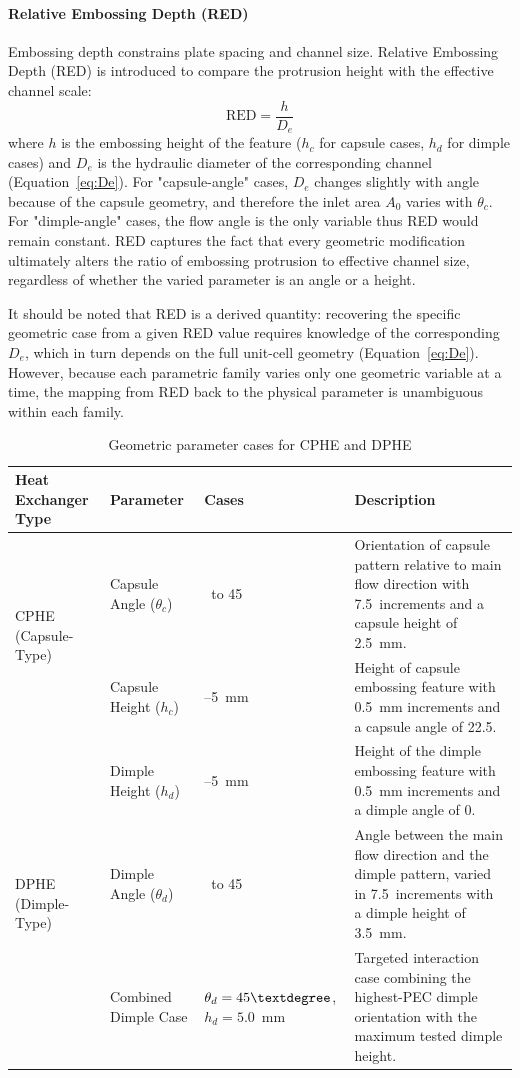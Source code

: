 \documentclass[energies,article,submit,moreauthors,noheaderline]{Definitions/mdpi}
\newcommand{\degree}{\texorpdfstring{\ensuremath{^\circ}}{\textdegree}}
\def\ensuremath#1{}%
\def\degree{\textdegree}%
\begin{document}
\paragraph{Relative Embossing Depth (RED)}
Embossing depth constrains plate spacing and channel size. Relative Embossing Depth (RED) is introduced to compare the protrusion height with the effective channel scale:
\begin{equation}
\text{RED} = \frac{h}{D_e}
\label{eq:red}
\end{equation}
where $h$ is the embossing height of the feature ($h_c$ for capsule cases, $h_d$ for dimple cases) and $D_e$ is the hydraulic diameter of the corresponding channel (Equation~\eqref{eq:De}). For "capsule-angle" cases, $D_e$ changes slightly with angle because of the capsule geometry, and therefore the inlet area $A_0$ varies with $\theta_c$. For "dimple-angle" cases, the flow angle is the only variable thus RED would remain constant. RED captures the fact that every geometric modification ultimately alters the ratio of embossing protrusion to effective channel size, regardless of whether the varied parameter is an angle or a height.

It should be noted that RED is a derived quantity: recovering the specific geometric case from a given RED value requires knowledge of the corresponding $D_e$, which in turn depends on the full unit-cell geometry (Equation~\eqref{eq:De}). However, because each parametric family varies only one geometric variable at a time, the mapping from RED back to the physical parameter is unambiguous within each family.

\begin{table}[H]
\centering
\caption{Geometric parameter cases for CPHE and DPHE}
\label{tab:geom_cases}
\footnotesize
\renewcommand{\arraystretch}{1}
\begin{tabularx}{\textwidth}{ll>{\raggedright\arraybackslash}l>{\raggedright\arraybackslash}X}
\hline
\textbf{Heat Exchanger Type} & \textbf{Parameter} & \textbf{Cases} & \textbf{Description} \\ \hline
\multirow{2}{*}{CPHE (Capsule-Type)} 
& Capsule Angle ($\theta_c$) & 0\degree\ to 45\degree & Orientation of capsule pattern relative to main flow direction with 7.5\degree\ increments and a capsule height of 2.5~mm. \\
& Capsule Height ($h_c$) & 2--5~mm & Height of capsule embossing feature with 0.5~mm increments and a capsule angle of 22.5\degree. \\ \hline
\multirow{3}{*}{DPHE (Dimple-Type)} 
& Dimple Height ($h_d$) & 2--5~mm & Height of the dimple embossing feature with 0.5~mm increments and a dimple angle of 0\degree. \\
& Dimple Angle ($\theta_d$) & 0\degree\ to 45\degree & Angle between the main flow direction and the dimple pattern, varied in 7.5\degree\ increments with a dimple height of 3.5~mm. \\
& Combined Dimple Case & $\theta_d=45\degree$, $h_d=5.0$~mm & Targeted interaction case combining the highest-PEC dimple orientation with the maximum tested dimple height. \\ \hline
\end{tabularx}
\end{table}
\end{document}
